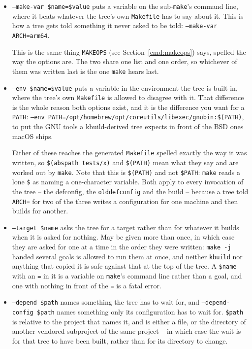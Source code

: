 \documentclass{article}
\begin{document}
\begin{itemize}
\item \texttt{--make-var \$name=\$value} puts a variable on the
  sub-\texttt{make}'s command line, where it beats whatever the
  tree's own \texttt{Makefile} has to say about it.  This is how a
  tree gets told something it never asked to be told:
  \texttt{--make-var ARCH=arm64}.

  This is the same thing \texttt{MAKEOPS} (see
  Section~\ref{cmd:makeops}) says, spelled the way the options are.
  The two share one list and one order, so whichever of them was
  written last is the one \texttt{make} hears last.

\item \texttt{--env \$name=\$value} puts a variable in the environment
  the tree is built in, where the tree's own \texttt{Makefile} is
  allowed to disagree with it.  That difference is the whole reason
  both options exist, and it is the difference you want for a
  \texttt{PATH}: \texttt{--env
  PATH=/opt/homebrew/opt/coreutils/libexec/gnubin:\$(PATH)}, to put
  the GNU tools a kbuild-derived tree expects in front of the BSD
  ones macOS ships.

  Either of these reaches the generated \texttt{Makefile} spelled
  exactly the way it was written, so \texttt{\$(abspath tests/x)} and
  \texttt{\$(PATH)} mean what they say and are worked out by
  \texttt{make}.  Note that this is \texttt{\$(PATH)} and not
  \texttt{\$PATH}: \texttt{make} reads a lone \texttt{\$} as naming a
  one-character variable.  Both apply to every invocation of the
  tree -- the defconfig, the \texttt{olddefconfig} and the build --
  because a tree told \texttt{ARCH=} for two of the three writes a
  configuration for one machine and then builds for another.

\item \texttt{--target \$name} asks the tree for a target rather than
  for whatever it builds when it is asked for nothing.  May be given
  more than once, in which case they are asked for one at a time in
  the order they were written: \texttt{make -j} handed several goals
  is allowed to run them at once, and neither \texttt{kbuild} nor
  anything that copied it is safe against that at the top of the
  tree.  A \texttt{\$name} with an \texttt{=} in it is a variable on
  \texttt{make}'s command line rather than a goal, and one with nothing
  in front of the \texttt{=} is a fatal error.

\item \texttt{--depend \$path} names something the tree has to wait
  for, and \texttt{--depend-config \$path} names something only its
  configuration has to wait for.  \texttt{\$path} is relative to the
  project that names it, and is either a file, or the directory of
  another vendored subproject of the same project -- in which case
  the wait is for that tree to have been built, rather than for its
  directory to change.


\end{itemize}
\end{document}
